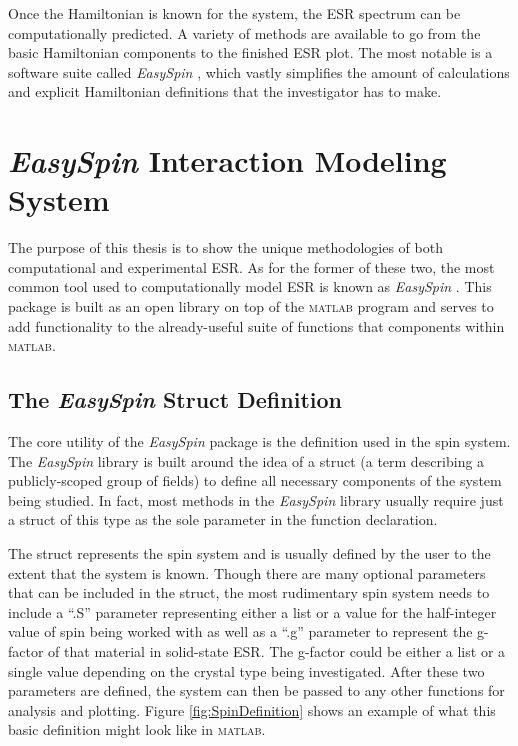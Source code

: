 \documentclass[oneside, noacknowlegments]{BYUPhys}
\begin{document}
Once the Hamiltonian is known for the system, the ESR spectrum can be computationally predicted. A variety of methods are available to go from the basic Hamiltonian components to the finished ESR plot. The most notable is a software suite called \textit{EasySpin} \cite{RefWorks:doc:58929a02e4b0d4c09201f91b}, which vastly simplifies the amount of calculations and explicit Hamiltonian definitions that the investigator has to make.

\section{\textit{EasySpin} Interaction Modeling System}

The purpose of this thesis is to show the unique methodologies of both computational and experimental ESR. As for the former of these two, the most common tool used to computationally model ESR is known as \textit{EasySpin} \cite{RefWorks:doc:58929a02e4b0d4c09201f91b}. This package is built as an open library on top of the \textsc{matlab} program and serves to add functionality to the already-useful suite of functions that components within \textsc{matlab}.

\subsection{The \textit{EasySpin} Struct Definition}

The core utility of the \textit{EasySpin} package is the definition used in the spin system. The \textit{EasySpin} library is built around the idea of a struct (a term describing a publicly-scoped group of fields) to define all necessary components of the system being studied. In fact, most methods in the \textit{EasySpin} library usually require just a struct of this type as the sole parameter in the function declaration.

The struct represents the spin system and is usually defined by the user to the extent that the system is known. Though there are many optional parameters that can be included in the struct, the most rudimentary spin system needs to include a ``.S'' parameter representing either a list or a value for the half-integer value of spin being worked with as well as a ``.g'' parameter to represent the g-factor of that material in solid-state ESR. The g-factor could be either a list or a single value depending on the crystal type being investigated. After these two parameters are defined, the system can then be passed to any other functions for analysis and plotting. Figure \ref{fig:SpinDefinition} shows an example of what this basic definition might look like in \textsc{matlab}.
\end{document}
